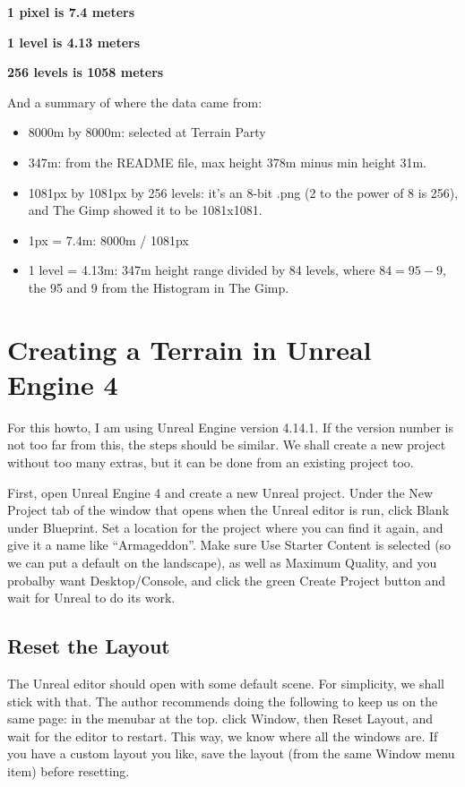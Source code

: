 \documentclass[letter,12pt]{article}
\begin{document}
\textbf{1 pixel is 7.4 meters}

\textbf{1 level is 4.13 meters}

\textbf{256 levels is 1058 meters}

And a summary of where the data came from:

\begin{itemize}
\item 8000m by 8000m: selected at Terrain Party

\item 347m: from the README file, max height 378m minus min height 31m.

\item 1081px by 1081px by 256 levels: it’s an 8-bit .png (2 to the power of 8 is 256), and The Gimp showed it to be 1081x1081.

\item 1px = 7.4m: 8000m / 1081px

\item 1 level = 4.13m: 347m height range divided by 84 levels, where $84 = 95-9$, the 95 and 9 from the Histogram in The Gimp.
\end{itemize}

\section{Creating a Terrain in Unreal Engine 4}
For this howto, I am using  Unreal Engine version 4.14.1.  If the version number is not too far from this, the steps should be similar.  We shall create a new project without too many extras, but it can be done from an existing project too.

First, open Unreal Engine 4 and create a new Unreal project.  Under the New Project tab of the window that opens when the Unreal editor is run, click Blank under Blueprint.  Set a location for the project where you can find it again, and give it a name like “Armageddon”.  Make sure Use Starter Content is selected (so we can put a default on the landscape), as well as Maximum Quality, and you probalby want Desktop/Console, and click the green Create Project button and wait for Unreal to do its work.

\subsection{Reset the Layout}
The Unreal editor should open with some default scene.  For simplicity, we shall stick with that.  The author recommends doing the following to keep us on the same page: in the menubar at the top. click Window, then Reset Layout, and wait for the editor to restart.  This way, we know where all the windows are.  If you have a custom layout you like, save the layout (from the same Window menu item) before resetting.
\end{document}
